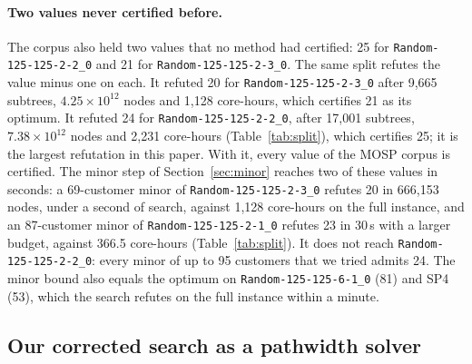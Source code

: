 \paragraph{Two values never certified before.} The corpus also held two values that
no method had certified: 25 for \texttt{Random-125-125-2-2\_0} and 21 for
\texttt{Random-125-125-2-3\_0}. The same split refutes the value minus one on
each. It refuted 20 for \texttt{Random-125-125-2-3\_0} after
9,665 subtrees, $4.25\times10^{12}$ nodes and 1,128 core-hours, which
certifies 21 as its optimum. It refuted 24 for
\texttt{Random-125-125-2-2\_0}, after 17,001 subtrees,
$7.38\times10^{12}$ nodes and 2,231 core-hours (Table~\ref{tab:split}), which
certifies 25; it is the largest refutation in this paper. With it, every value
of the MOSP corpus is certified. The minor step of Section~\ref{sec:minor}
reaches two of these values in seconds: a 69-customer minor of \texttt{Random-125-125-2-3\_0} refutes 20 in 666,153
nodes, under a second of search, against
1,128 core-hours on the full instance, and an 87-customer minor of
\texttt{Random-125-125-2-1\_0} refutes 23 in 30\,s with a larger budget, against 366.5 core-hours
(Table~\ref{tab:split}). It does not reach
\texttt{Random-125-125-2-2\_0}: every minor of up to 95 customers that we tried admits 24. The minor bound
also equals the optimum on \texttt{Random-125-125-6-1\_0} (81) and SP4 (53),
which the search refutes on the full instance within a minute.

\subsection{Our corrected search as a pathwidth solver}
\label{sec:pwsolver}


